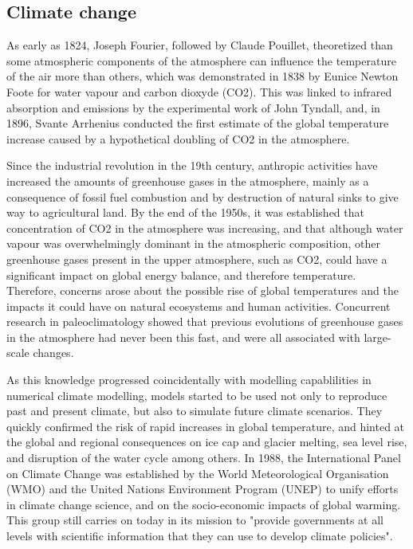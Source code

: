 
\subsection{Climate change}
As early as 1824, Joseph Fourier, followed by Claude Pouillet, theoretized than some atmospheric components of the atmosphere can influence the temperature of the air more than others, which was demonstrated in 1838 by Eunice Newton Foote for water vapour and carbon dioxyde (CO2). This was linked to infrared absorption and emissions by the experimental work of John Tyndall, and, in 1896, Svante Arrhenius conducted the first estimate of the global temperature increase caused by a hypothetical doubling of CO2 in the atmosphere.

Since the industrial revolution in the 19th century, anthropic activities have increased %
the amounts of greenhouse gases in the atmosphere, mainly as a consequence of fossil fuel combustion and by destruction of natural sinks to give way to agricultural land.
By the end of the 1950s, it was established that concentration of CO2 in the atmosphere was increasing, %
and that although water vapour was overwhelmingly dominant in the atmospheric composition, other greenhouse gases present in the upper atmosphere, such as CO2, could have a significant impact on global energy balance, and therefore temperature. Therefore, concerns arose about the possible rise of global temperatures and the impacts it could have on natural ecosystems and human activities.
Concurrent research in paleoclimatology showed that previous evolutions of greenhouse gases in the atmosphere had never been this fast, and were all associated with large-scale changes. 

As this knowledge progressed coincidentally with modelling capablilities in numerical climate modelling, models started to be used not only to reproduce past and present climate, but also to simulate future climate scenarios. They quickly confirmed the risk of rapid increases in global temperature, and hinted at the global and regional consequences on ice cap and glacier melting, sea level rise, and disruption of the water cycle among others. In 1988, the International Panel on Climate Change was established by the World Meteorological Organisation (WMO) and the United Nations Environment Program (UNEP) to unify efforts in climate change science, and on the socio-economic impacts of global warming. This group still carries on today in its mission to "provide governments at all levels with scientific information that they can use to develop climate policies".

